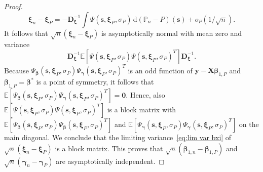 \documentclass{article}
\numberwithin{equation}{section}
\theoremstyle{plain}
\newcommand{\dd}{\mathrm{d}}
\newcommand{\bbeta}{\bm\beta}
\newcommand{\bxi}{\bm\xi}
\newcommand{\bgamma}{\bm\gamma}
\newcommand{\by}{\mathbf{y}}
\newcommand{\bX}{\mathbf{X}}
\newcommand{\bD}{\mathbf{D}}
\newcommand{\E}{\mathbb{E}}
\begin{document}
\begin{proof}
\begin{equation}
\label{eq:expansion xi}
\bxi_n-\bxi_P
=
-\bD_{\bxi}^{-1}
\int \Psi(\mathbf{s},\bxi_P,\sigma_P)\,\dd (\mathbb{P}_n-P)(\mathbf{s})
+
o_P(1/\sqrt{n}).
\end{equation}
It follows that $\sqrt{n}(\bxi_n-\bxi_P)$ is asymptotically normal with mean zero and variance
\begin{equation}
\label{eq:lim var bxi}
\bD_{\bxi}^{-1}
\E\left[
\Psi(\mathbf{s},\bxi_P,\sigma_P)
\Psi(\mathbf{s},\bxi_P,\sigma_P)^T
\right]
\bD_{\bxi}^{-1}.
\end{equation}
Because $\Psi_{\bbeta}(\mathbf{s},\bxi_P,\sigma_P)\Psi_{\bgamma}(\mathbf{s},\bxi_P,\sigma_P)^T$ is
an odd function of $\by-\bX\bbeta_{1,P}$ and~$\bbeta_{1,P}=\bbeta^*$ is a point of symmetry,
it follows that 
$\E[\Psi_{\bbeta}(\mathbf{s},\bxi_P,\sigma_P)\Psi_{\bgamma}(\mathbf{s},\bxi_P,\sigma_P)^T]=\mathbf{0}$.
Hence, also $\E[\Psi(\mathbf{s},\bxi_P,\sigma_P)\Psi(\mathbf{s},\bxi_P,\sigma_P)^T]$
is a block matrix with 
$\E[\Psi_{\bbeta}(\mathbf{s},\bxi_P,\sigma_P)\Psi_{\bbeta}(\mathbf{s},\bxi_P,\sigma_P)^T]$
and 
$\E[\Psi_{\bgamma}(\mathbf{s},\bxi_P,\sigma_P)\Psi_{\bgamma}(\mathbf{s},\bxi_P,\sigma_P)^T]$
on the main diagonal.
We conclude that the limiting variance~\eqref{eq:lim var bxi} of $\sqrt{n}(\bxi_n-\bxi_P)$
is a block matrix.
This proves that $\sqrt{n}(\bbeta_{1,n}-\bbeta_{1,P})$ and
$\sqrt{n}(\bgamma_n-\bgamma_P)$ are asymptotically independent.


\end{proof}
\end{document}
